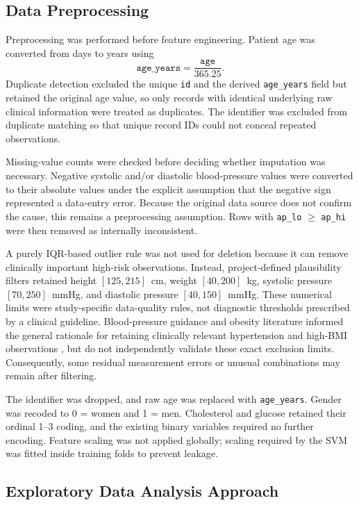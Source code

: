 \documentclass[11pt,a4paper]{article}
\newcommand{\code}[1]{\texttt{#1}}
\begin{document}
\subsection{Data Preprocessing}

Preprocessing was performed before feature engineering. Patient age was converted from days to years using
\[
\code{age\_years}=\frac{\code{age}}{365.25}.
\]
Duplicate detection excluded the unique \code{id} and the derived \code{age\_years} field but retained the original age value, so only records with identical underlying raw clinical information were treated as duplicates. The identifier was excluded from duplicate matching so that unique record IDs could not conceal repeated observations.

Missing-value counts were checked before deciding whether imputation was necessary. Negative systolic and/or diastolic blood-pressure values were converted to their absolute values under the explicit assumption that the negative sign represented a data-entry error. Because the original data source does not confirm the cause, this remains a preprocessing assumption. Rows with \code{ap\_lo} $\geq$ \code{ap\_hi} were then removed as internally inconsistent.

A purely IQR-based outlier rule was not used for deletion because it can remove clinically important high-risk observations. Instead, project-defined plausibility filters retained height $[125,215]$~cm, weight $[40,200]$~kg, systolic pressure $[70,250]$~mmHg, and diastolic pressure $[40,150]$~mmHg. These numerical limits were study-specific data-quality rules, not diagnostic thresholds prescribed by a clinical guideline. Blood-pressure guidance and obesity literature informed the general rationale for retaining clinically relevant hypertension and high-BMI observations \cite{whelton2018,whoObesity2025}, but do not independently validate these exact exclusion limits. Consequently, some residual measurement errors or unusual combinations may remain after filtering.

The identifier was dropped, and raw age was replaced with \code{age\_years}. Gender was recoded to 0 = women and 1 = men. Cholesterol and glucose retained their ordinal 1--3 coding, and the existing binary variables required no further encoding. Feature scaling was not applied globally; scaling required by the SVM was fitted inside training folds to prevent leakage.

\subsection{Exploratory Data Analysis Approach}
\end{document}
